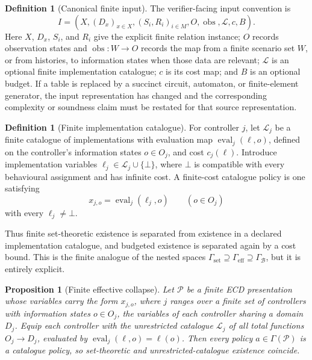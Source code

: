 \documentclass[11pt]{article}
\theoremstyle{plain}
\newtheorem{proposition}[theorem]{Proposition}
\theoremstyle{definition}
\newtheorem{definition}[theorem]{Definition}
\theoremstyle{remark}
\newcommand{\GammaSet}{\Gamma_{\mathrm{set}}}
\newcommand{\GammaEff}{\Gamma_{\mathrm{eff}}}
\newcommand{\GammaB}{\Gamma_{\mathcal B}}
\begin{document}
\begin{definition}[Canonical finite input]
\label{def:canonical-input}
The verifier-facing input convention is
\[
I=(X,(D_x)_{x\in X},(S_i,R_i)_{i\in M},O,\operatorname{obs},
\mathcal L,c,B).
\]
Here \(X\), \(D_x\), \(S_i\), and \(R_i\) give the explicit finite relation
instance; \(O\) records observation states and
\(\operatorname{obs}:W\to O\) records the map from a finite scenario set \(W\),
or from histories, to information states when those data are relevant;
\(\mathcal L\) is an optional finite implementation catalogue; \(c\) is its cost
map; and \(B\) is an optional budget.  If a table is replaced by a succinct
circuit, automaton, or finite-element generator, the input representation has
changed and the corresponding complexity or soundness claim must be restated for
that source representation.
\end{definition}

\begin{definition}[Finite implementation catalogue]
For controller \(j\), let \(\mathcal L_j\) be a finite catalogue of
implementations with evaluation map \(\operatorname{eval}_j(\ell,o)\), defined
on the controller's information states \(o\in O_j\), and cost \(c_j(\ell)\).  Introduce implementation variables
\(\ell_j\in\mathcal L_j\cup\{\bot\}\), where \(\bot\) is compatible with every
behavioural assignment and has infinite cost.  A finite-cost catalogue policy is
one satisfying
\[
  x_{j,o}=\operatorname{eval}_j(\ell_j,o)
  \qquad(o\in O_j)
\]
with every \(\ell_j\ne\bot\).
\end{definition}

Thus finite set-theoretic existence is separated from existence in a declared
implementation catalogue, and budgeted existence is separated again by a cost
bound.  This is the finite analogue of the nested spaces
\(\GammaSet\supseteq\GammaEff\supseteq\GammaB\), but it is entirely explicit.

\begin{proposition}[Finite effective collapse]
\label{prop:finite-collapse}
Let \(\mathcal P\) be a finite ECD presentation whose variables carry the form
\(x_{j,o}\), where \(j\) ranges over a finite set of controllers with
information states \(o\in O_j\), the variables of each controller sharing a
domain \(D_j\).  Equip each controller with the unrestricted catalogue
\(\mathcal L_j\) of all total functions \(O_j\to D_j\), evaluated by
\(\operatorname{eval}_j(\ell,o)=\ell(o)\).  Then every policy
\(a\in\Gamma(\mathcal P)\) is a catalogue policy, so set-theoretic and
unrestricted-catalogue existence coincide.
\end{proposition}
\end{document}
